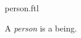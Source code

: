 \documentclass{stex}
\begin{document}
\begin{smodule}{person.ftl}


\begin{signature}[forthel]
  A \emph{person} is a being.
\end{signature}

\end{smodule}
\end{document}

